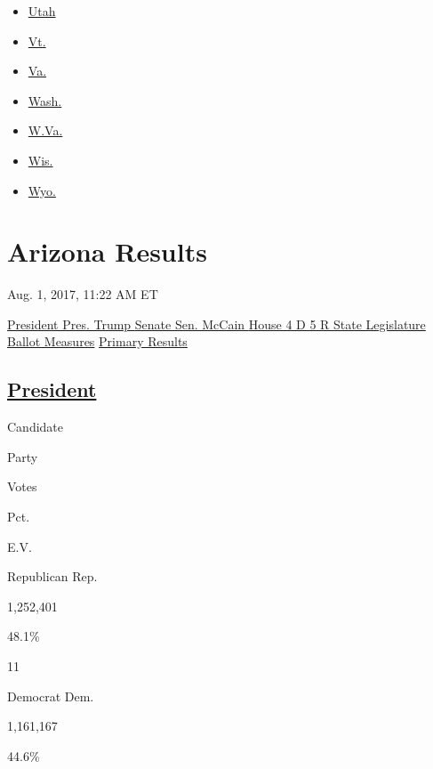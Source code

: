 \begin{itemize}
\tightlist
\item
  \href{//www.nytimes.com/elections/2016/results/utah}{Utah}
\item
  \href{//www.nytimes.com/elections/2016/results/vermont}{Vt.}
\item
  \href{//www.nytimes.com/elections/2016/results/virginia}{Va.}
\item
  \href{//www.nytimes.com/elections/2016/results/washington}{Wash.}
\item
  \href{//www.nytimes.com/elections/2016/results/west-virginia}{W.Va.}
\item
  \href{//www.nytimes.com/elections/2016/results/wisconsin}{Wis.}
\item
  \href{//www.nytimes.com/elections/2016/results/wyoming}{Wyo.}
\end{itemize}

\hypertarget{arizona-results}{%
\section{Arizona Results}\label{arizona-results}}

 Aug. 1, 2017, 11:22 AM ET

\protect\hyperlink{president}{ President Pres. Trump }
\protect\hyperlink{senate}{ Senate Sen. McCain }
\protect\hyperlink{house}{House 4 D 5 R }
\protect\hyperlink{state-legislature}{State Legislature}
\protect\hyperlink{ballot-measure}{Ballot Measures}
\href{//www.nytimes.com/elections/2016/results/primaries/arizona}{Primary
Results}

\hypertarget{president}{%
\subsection{\texorpdfstring{\href{https://www.nytimes.com/elections/2016/results/arizona-president-clinton-trump}{President}}{President}}\label{president}}

Candidate

Party

Votes

Pct.

E.V.

Republican Rep.

1,252,401

48.1\%

11

Democrat Dem.

1,161,167

44.6\%

